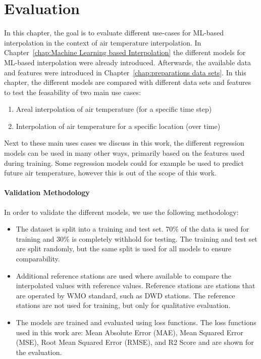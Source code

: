 \chapter{Evaluation}
\label{chap:Evaluation}


In this chapter, the goal is to evaluate different use-cases for ML-based interpolation in the context of air temperature interpolation. In Chapter~\ref{chap:Machine Learning based Interpolation} the different models for ML-based interpolation were already introduced. Afterwards, the available data and features were introduced in Chapter~\ref{chap:preparations data sets}. In this chapter, the different models are compared with different data sets and features to test the feasability of two main use cases:

\begin{enumerate}
  \item Areal interpolation of air temperature (for a specific time step)
  \item Interpolation of air temperature for a specific location (over time)
\end{enumerate}

Next to these main uses cases we discuss in this work, the different regression models can be used in many other ways, primarily based on the features used during training. Some regression models could for example be used to predict future air temperature, however this is out of the scope of this work.

\subsubsection{Validation Methodology}
\label{sec:validation methodology}

In order to validate the different models, we use the following methodology:

\begin{itemize}
  \item The dataset is split into a training and test set. 70\% of the data is used for training and 30\% is completely withhold for testing. The training and test set are split randomly, but the same split is used for all models to ensure comparability.
  \item Additional reference stations are used where available to compare the interpolated values with reference values. Reference stations are stations that are operated by WMO standard, such as DWD stations. The reference stations are not used for training, but only for qualitative evaluation.
  \item The models are trained and evaluated using loss functions. The loss functions used in this work are: Mean Absolute Error (MAE), Mean Squared Error (MSE), Root Mean Squared Error (RMSE), and R2 Score and are shown for the evaluation.
\end{itemize}

